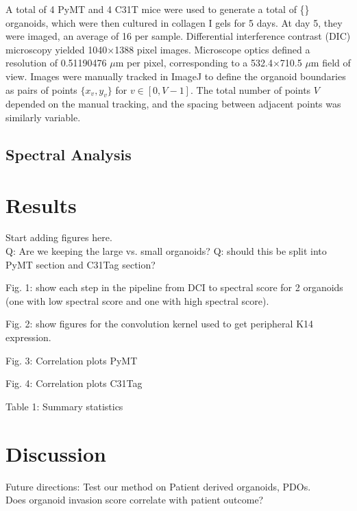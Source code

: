 \documentclass[runningheads]{llncs}
\begin{document}
 A total of 4 PyMT and 4 C31T mice were used to generate a total of \{\} organoids, which were then cultured in collagen I gels for 5 days. At day 5, they were imaged, an average of 16 per sample. Differential interference contrast (DIC) microscopy yielded 1040$\times$1388 pixel images. Microscope optics defined a resolution of 0.51190476 $\mu$m per pixel, corresponding to a 532.4$\times$710.5 $\mu$m field of view. Images were manually tracked in {\sc ImageJ} \cite{Schneider:2012ui} to define the organoid boundaries as pairs of points $\{x_v,y_v\}$ for $v \in [0,V-1]$. The total number of points $V$ depended on the manual tracking, and the spacing between adjacent points was similarly variable.

\subsection{Spectral Analysis}

\subsubsection{}

\section{Results}

Start adding figures here.\\
Q: Are we keeping the large vs. small organoids?
Q: should this be split into PyMT section and C31Tag section?

Fig. 1: show each step in the pipeline from DCI to spectral score for 2 organoids (one with low spectral score and one with high spectral score).

Fig. 2: show figures for the convolution kernel used to get peripheral K14 expression.

Fig. 3: Correlation plots PyMT

Fig. 4: Correlation plots C31Tag

Table 1: Summary statistics

\section{Discussion}

Future directions: Test our method on Patient derived organoids, PDOs.\\
Does organoid invasion score correlate with patient outcome?
\end{document}
